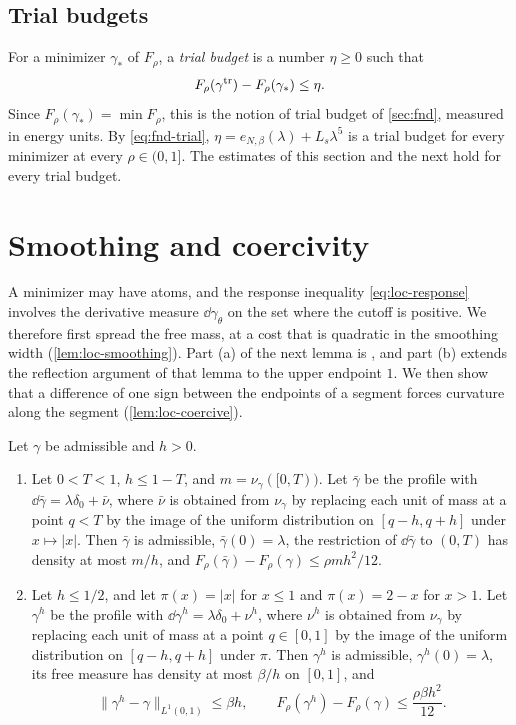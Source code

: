 \subsection{Trial budgets}
For a minimizer $\gamma_*$ of $F_\rho$, a \emph{trial budget} is a number
$\eta\ge0$ such that
\begin{equation}\label{eq:loc-trialbudget}
 F_\rho(\gamma^{\rm tr})-F_\rho(\gamma_*)\le\eta .
\end{equation}
Since $F_\rho(\gamma_*)=\min F_\rho$, this is the notion of trial budget of
\cref{sec:fnd}, measured in energy units. By \eqref{eq:fnd-trial},
$\eta=e_{N,\beta}(\lambda)+L_s\lambda^5$ is a trial budget for every
minimizer at every $\rho\in(0,1]$. The estimates of this section and the next
hold for every trial budget.

\section{Smoothing and coercivity}

A minimizer may have atoms, and the response inequality
\eqref{eq:loc-response} involves the derivative measure $\dd\gamma_\theta$ on
the set where the cutoff is positive. We therefore first spread the free mass,
at a cost that is quadratic in the smoothing width (\cref{lem:loc-smoothing}).
Part (a) of the next lemma is \cite[Lemma~7.5]{AL}, and part (b) extends the
reflection argument of that lemma to the upper endpoint $1$. We then show
that a difference of one sign between the endpoints of a segment forces
curvature along the segment (\cref{lem:loc-coercive}).

\begin{lemma}\label{lem:loc-smoothing}
Let $\gamma$ be admissible and $h>0$.
\begin{enumerate}
\item[(a)] Let $0<T<1$, $h\le1-T$, and $m=\nu_\gamma([0,T))$. Let
$\bar\gamma$ be the profile with $\dd\bar\gamma=\lambda\delta_0+\bar\nu$, where
$\bar\nu$ is obtained from $\nu_\gamma$ by replacing each unit of mass at a
point $q<T$ by the image of the uniform distribution on $[q-h,q+h]$ under
$x\mapsto|x|$. Then $\bar\gamma$ is
admissible, $\bar\gamma(0)=\lambda$, the restriction of $\dd\bar\gamma$ to
$(0,T)$ has density at most $m/h$, and
$F_\rho(\bar\gamma)-F_\rho(\gamma)\le\rho mh^2/12$.
\item[(b)] Let $h\le1/2$, and let $\pi(x)=|x|$ for $x\le1$ and $\pi(x)=2-x$
for $x>1$. Let $\gamma^h$ be the profile with
$\dd\gamma^h=\lambda\delta_0+\nu^h$, where $\nu^h$ is obtained from $\nu_\gamma$
by replacing each unit of mass at a point $q\in[0,1]$ by the image of the
uniform distribution on $[q-h,q+h]$ under $\pi$. Then $\gamma^h$ is admissible, $\gamma^h(0)=\lambda$, its
free measure has density at most $\beta/h$ on $[0,1]$, and
\[
 \|\gamma^h-\gamma\|_{L^1(0,1)}\le\beta h,\qquad
 F_\rho(\gamma^h)-F_\rho(\gamma)\le\frac{\rho\beta h^2}{12} .
\]
\end{enumerate}
\end{lemma}

